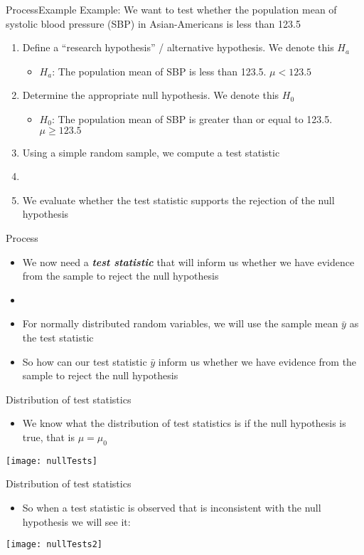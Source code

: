 \documentclass[xcolor=dvipsnames]{beamer}
\begin{document}
\begin{frame}{Process}{Example}
Example: We want to test whether the population mean of systolic blood pressure (SBP) in Asian-Americans is less than 123.5\\
\vspace{10 pt}
	\begin{enumerate}
		\item Define a ``research hypothesis'' / alternative hypothesis. We denote this $H_a$
		\begin{itemize}
			\item $H_a$: The population mean of SBP is less than 123.5. $\mu < 123.5$
		\end{itemize}
		\item Determine the appropriate null hypothesis. We denote this $H_0$
		\begin{itemize}
			\item $H_0$: The population mean of SBP is greater than or equal to 123.5. $\mu \geq 123.5$
		\end{itemize}
		\item Using a simple random sample, we compute a test statistic
		\item[]
		\item We evaluate whether the test statistic supports the rejection of the null hypothesis
	\end{enumerate}
\end{frame}

\begin{frame}{Process}
	\begin{itemize}
		\item We now need a \textbf{\emph{test statistic}} that will inform us whether we have evidence from the sample to reject the null hypothesis
		\item[]
		\item For normally distributed random variables, we will use the sample mean $\bar{y}$ as the test statistic
		\item[] So how can our test statistic $\bar{y}$ inform us whether we have evidence from the sample to reject the null hypothesis
	\end{itemize}
\end{frame}

\begin{frame}{Distribution of test statistics}
	\begin{itemize}
		\item We know what the distribution of test statistics is if the null hypothesis is true, that is $\mu = \mu_0$
	\end{itemize}
\begin{center}
	\texttt{[image: nullTests]}
\end{center}
\end{frame}

\begin{frame}{Distribution of test statistics}
	\begin{itemize}
		\item So when a test statistic is observed that is inconsistent with the null hypothesis we will see it:
	\end{itemize}
	\begin{center}
		\texttt{[image: nullTests2]}
	\end{center}
\end{frame}
\end{document}
